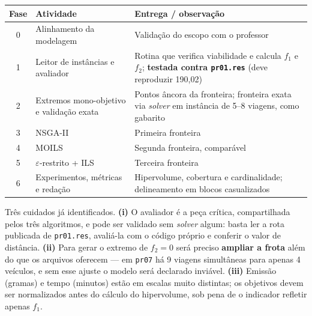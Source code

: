 \documentclass[10pt,a4paper]{article}
\theoremstyle{plain}
\begin{document}
\begin{center}
\small
\begin{tabular}{@{}clp{7.8cm}@{}}
\toprule
\textbf{Fase} & \textbf{Atividade} & \textbf{Entrega / observação} \\
\midrule
0 & Alinhamento da modelagem & Validação do escopo com o professor \\
1 & Leitor de instâncias e avaliador & Rotina que verifica viabilidade e calcula $f_1$ e $f_2$; \textbf{testada contra \texttt{pr01.res}} (deve reproduzir 190,02) \\
2 & Extremos mono-objetivo e validação exata & Pontos âncora da fronteira; fronteira exata via \textit{solver} em instância de 5--8 viagens, como gabarito \\
3 & NSGA-II & Primeira fronteira \\
4 & MOILS & Segunda fronteira, comparável \\
5 & $\varepsilon$-restrito + ILS & Terceira fronteira \\
6 & Experimentos, métricas e redação & Hipervolume, cobertura e cardinalidade; delineamento em blocos casualizados \\
\bottomrule
\end{tabular}
\end{center}

Três cuidados já identificados. \textbf{(i)} O avaliador é a peça crítica, compartilhada pelos três algoritmos, e pode ser validado sem \textit{solver} algum: basta ler a rota publicada de \texttt{pr01.res}, avaliá-la com o código próprio e conferir o valor de distância. \textbf{(ii)} Para gerar o extremo de $f_2=0$ será preciso \textbf{ampliar a frota} além do que os arquivos oferecem --- em \texttt{pr07} há 9 viagens simultâneas para apenas 4 veículos, e sem esse ajuste o modelo será declarado inviável. \textbf{(iii)} Emissão (gramas) e tempo (minutos) estão em escalas muito distintas; os objetivos devem ser normalizados antes do cálculo do hipervolume, sob pena de o indicador refletir apenas $f_1$.
\end{document}
